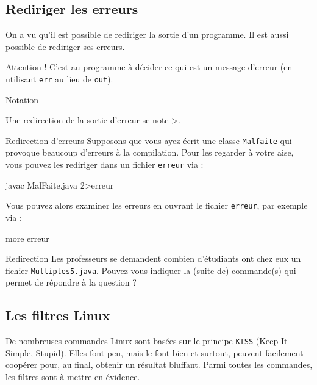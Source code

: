 \documentclass[a4paper,11pt]{article}
\begin{document}
	\subsection{Rediriger les erreurs}  
          	On a vu qu'il est possible de rediriger la sortie d'un programme.
		Il est aussi possible de rediriger ses erreurs.
				
          	Attention ! C'est au programme \`a d\'ecider ce qui est un message d'erreur (en utilisant
		\verb_err_ au lieu de \verb_out_).
			
		\begin{coltbox}{Notation}
		
					Une redirection de la sortie d'erreur se note >\guillemotright .
				
		\end{coltbox}
\newpage
			
		\begin{Exemple}{Redirection d'erreurs}
			Supposons que vous ayez \'ecrit une classe \verb_Malfaite_ qui provoque beaucoup d'erreurs \`a la compilation.
			Pour les regarder \`a votre aise, vous pouvez les rediriger dans un fichier 
					\verb_erreur_ via :
					\begin{Console}
						javac MalFaite.java 2>erreur
						
					\end{Console}
					Vous pouvez alors examiner les erreurs en ouvrant le fichier \verb_erreur_,
					par exemple via : 
					\begin{Console} 
						more erreur
					\end{Console}
					
		\end{Exemple}		
          	
		\begin{Exercice}{Redirection}        
			Les professeurs se demandent combien d'\'etudiants ont chez eux
			un fichier \verb_Multiples5.java_. Pouvez-vous indiquer la (suite de) commande(s)
			qui permet de r\'epondre \`a la question ?
		\end{Exercice}
				
            \par
        \subsection{Les filtres Linux}  
      		De nombreuses commandes Linux sont bas\'ees sur le principe \verb_KISS_ (Keep It Simple, Stupid).
		Elles font peu, mais le font bien et surtout, peuvent facilement coop\'erer pour, au final,
		obtenir un r\'esultat bluffant. Parmi toutes les commandes, les filtres sont \`a mettre en \'evidence.
		
\end{document}
